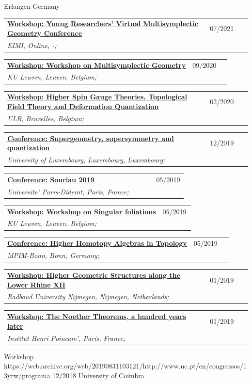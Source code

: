 \documentclass[a4paper]{article}
\newcommand{\longvoice}[8]{
    \begin{tabular}{p{0.83\linewidth} p{0.17\linewidth} }
        \textbf{\href{#3}{#2: #1}} & #4 
        \\ 
        \textit{#5, #6, #7;} & {\small\emph{#8}}
    \end{tabular}
    \vspace{.5em}
}
\begin{document}
        {Erlangen}
        {Germany}
        {}
    \longvoice{Young Researchers' Virtual Multisymplectic Geometry Conference}
        {Workshop}
        {https://public.eimi.ru/~cblacker/yrvmgc_21.html}
        {07/2021}
        {EIMI}
        {Online}
        {-}
        {}
    \longvoice{Workshop on Multisymplectic Geometry}
        {Workshop}
        {https://wis.kuleuven.be/events/archive/multisymplectic}
        {09/2020}
        {KU Leuven}
        {Leuven}
        {Belgium}
        {}
    \longvoice{Higher Spin Gauge Theories, Topological Field Theory and Deformation Quantization}
        {Workshop}
        {http://www.solvayinstitutes.be/event/workshop/higher_spin_2020/higher_spin_2020.html}
        {02/2020}
        {ULB}
        {Bruxelles}
        {Belgium}
        {}
    \longvoice{Supergeometry, supersymmetry and quantization}
        {Conference}
        {http://math.uni.lu/SuperWork/SuperConference.html}
        {12/2019}
        {University of Luxembourg}
        {Luxembourg}
        {Luxembourg}
        {}
    \longvoice{Souriau 2019}
        {Conference}
        {https://web.archive.org/web/20190831102558/http://souriau2019.fr/?page_id=2}
        {05/2019}
        {Universite' Paris-Diderot}
        {Paris}
        {France}
        {}
    \longvoice{Workshop on Singular foliations}
        {Workshop}
        {https://wis.kuleuven.be/agenda/sem-geometry/sem-geometry-upcoming}
        {05/2019}
        {KU Leuven}
        {Leuven}
        {Belgium}
        {}
    \longvoice{Higher Homotopy Algebras in Topology}
        {Conference}
        {https://web.archive.org/web/20190831103619/https://www.mpim-bonn.mpg.de/node/9245}
        {05/2019}
        {MPIM-Bonn}
        {Bonn}
        {Germany}
        {}
    \longvoice{Higher Geometric Structures along the Lower Rhine XII}
        {Workshop}
        {https://web.archive.org/web/20190831103524/https://www.math.ru.nl/~sagave/higher-structures-XII/}
        {01/2019}
        {Radboud University Nijmegen}
        {Nijmegen}
        {Netherlands}
        {}
    \longvoice{The Noether Theorems, a hundred years later}
        {Workshop}
        {https://web.archive.org/web/20190831105634/http://noether.iecl.univ-lorraine.fr/noether_en.html}
        {01/2019}
        {Institut Henri Poincare'}
        {Paris}
        {France}
        {}
        {Workshop}
        {https://web.archive.org/web/20190831103121/http://www.uc.pt/en/congressos/13yrw/programa}
        {12/2018}
        {University of Coimbra}
\end{document}
